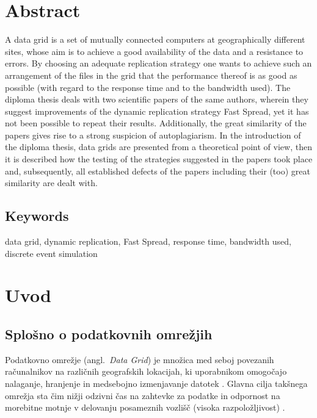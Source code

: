 \documentclass[a4paper, 12pt]{book}
\newcommand{\clearemptydoublepage}{
	\newpage{\pagestyle{empty}\cleardoublepage}}
\begin{document}
\chapter*{Abstract}

A data grid is a set of mutually connected computers at geographically
different sites, whose aim is to achieve a good availability of the data
and a resistance to errors. By choosing an adequate replication strategy one
wants to achieve such an arrangement of the files in the grid that the
performance thereof is as good as possible (with regard to the response time
and to the bandwidth used). The diploma thesis deals with two scientific papers
of the same authors, wherein they suggest improvements of the dynamic
replication strategy Fast Spread, yet it has not been possible to repeat their
results. Additionally, the great similarity of the papers gives rise to a
strong suspicion of autoplagiarism. In the introduction of the diploma thesis,
data grids are presented from a theoretical point of view, then it is
described how the testing of the strategies suggested in the papers took place
and, subsequently, all established defects of the papers including their (too)
great similarity are dealt with.

\section*{Keywords}
data grid, dynamic replication, Fast Spread, response time, bandwidth used,
discrete event simulation


\clearemptydoublepage


\mainmatter
\setcounter{page}{1}
\pagestyle{fancy}

\chapter{Uvod}

\section{Splošno o podatkovnih omrežjih}

Podatkovno omrežje (angl.~\textit{Data Grid}) je množica med seboj
povezanih ra\-ču\-nal\-ni\-kov na različnih geografskih lokacijah, ki
uporabnikom omogočajo nalaganje, hranjenje in medsebojno izmenjavanje datotek
\cite{dgrid_def}. Glavna cilja takšnega omrežja sta čim nižji odzivni čas na
zahtevke za podatke in odpornost na morebitne motnje v delovanju posameznih
vozlišč (visoka razpoložljivost) \cite{dgrid_def}.
\end{document}
